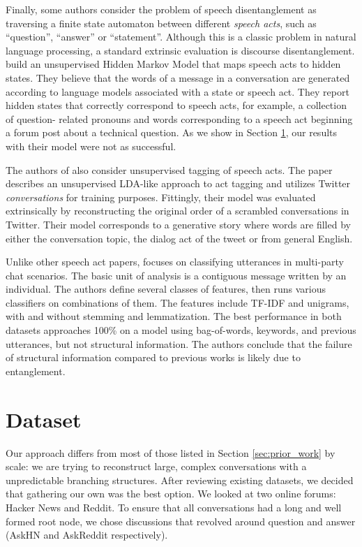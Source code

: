 \documentclass{article}
\begin{document}
Finally, some authors consider the problem of speech disentanglement as
traversing a finite state automaton between different \textit{speech acts},
such as ``question'', ``answer'' or ``statement''. Although this is a classic
problem in natural language processing, a standard extrinsic evaluation is
discourse disentanglement.  build an unsupervised
Hidden Markov Model that  maps speech acts to hidden states. They believe that
the words of a message in a conversation are generated according to language
models associated with a state or speech act. They report hidden states that
correctly correspond to speech acts, for example, a collection of question-
related pronouns and words corresponding to a speech act beginning a forum
post about a technical question. As we show in Section \ref{sec:dataset}, our
results with their model were not as successful.

The authors of \cite{Ritter2010a} also consider unsupervised tagging of speech
acts. The paper describes an unsupervised LDA-like approach to act tagging and
utilizes Twitter \textit{conversations} for training purposes. Fittingly,
their model was evaluated extrinsically by reconstructing the original order
of a scrambled conversations in Twitter. Their model corresponds to a
generative story where words are filled by either the conversation topic, the
dialog act of the tweet or from general English.

Unlike other speech act papers, \cite{Kim2012} focuses on classifying
utterances in multi-party chat scenarios. The basic unit of analysis is a
contiguous message written by an individual. The authors define several
classes of features, then runs various classifiers on combinations of them.
The features include TF-IDF and unigrams, with and without stemming and
lemmatization.  The best performance in both datasets approaches 100\% on a
model using bag-of-words, keywords, and previous utterances, but not
structural information. The authors conclude that the failure of structural
information compared to previous works is likely due to entanglement.

\section{Dataset}
\label{sec:dataset}
Our approach differs from most of those listed in Section \ref{sec:prior_work}
by scale: we are trying to reconstruct large, complex conversations with a
unpredictable branching structures. After reviewing existing datasets, we
decided that gathering our own was the best option. We looked at two online
forums: Hacker News and Reddit. To ensure that all conversations had a long
and well formed root node, we chose discussions that revolved around question
and answer (AskHN and AskReddit respectively).
\end{document}

